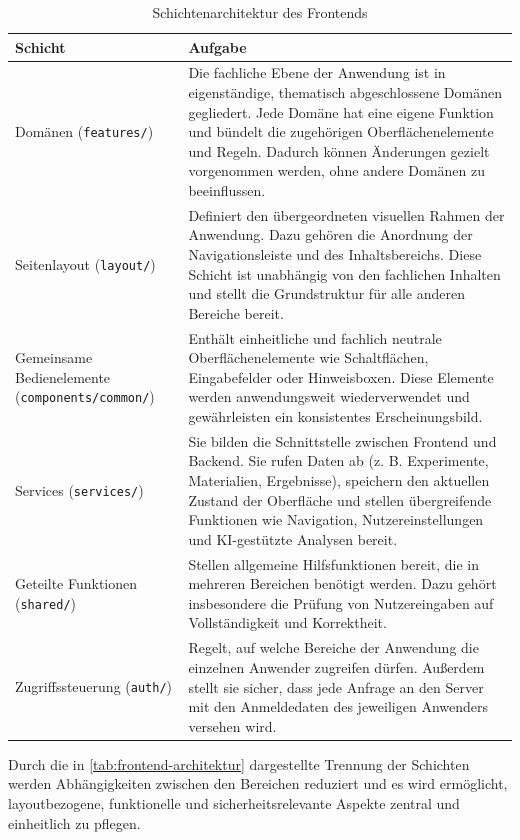 \begin{table}[H]
\centering
\caption{Schichtenarchitektur des Frontends}
\label{tab:frontend-architektur}
\renewcommand{\arraystretch}{1.3}
\begin{tabularx}{\textwidth}{@{}p{}X@{}}
\toprule
\textbf{Schicht} & \textbf{Aufgabe} \\
\midrule
Domänen (\texttt{features/}) & Die fachliche Ebene der Anwendung ist in eigenständige, thematisch abgeschlossene Domänen gegliedert. Jede Domäne hat eine eigene Funktion und bündelt die zugehörigen Oberflächenelemente und Regeln. Dadurch können Änderungen gezielt vorgenommen werden, ohne andere Domänen zu beeinflussen. \\
\addlinespace
Seitenlayout (\texttt{layout/}) & Definiert den übergeordneten visuellen Rahmen der Anwendung. Dazu gehören die Anordnung der Navigationsleiste und des Inhaltsbereichs. Diese Schicht ist unabhängig von den fachlichen Inhalten und stellt die Grundstruktur für alle anderen Bereiche bereit. \\
\addlinespace
Gemeinsame Bedienelemente (\texttt{components/common/}) & Enthält einheitliche und fachlich neutrale Oberflächenelemente wie Schaltflächen, Eingabefelder oder Hinweisboxen. Diese Elemente werden anwendungsweit wiederverwendet und gewährleisten ein konsistentes Erscheinungsbild. \\
\addlinespace
Services (\texttt{services/}) & Sie bilden die Schnittstelle zwischen Frontend und Backend. Sie rufen Daten ab (z. B. Experimente, Materialien, Ergebnisse), speichern den aktuellen Zustand der Oberfläche und stellen übergreifende Funktionen wie Navigation, Nutzereinstellungen und KI-gestützte Analysen bereit. \\
\addlinespace
Geteilte Funktionen (\texttt{shared/}) & Stellen allgemeine Hilfsfunktionen bereit, die in mehreren Bereichen benötigt werden. Dazu gehört insbesondere die Prüfung von Nutzereingaben auf Vollständigkeit und Korrektheit. \\
\addlinespace
Zugriffssteuerung (\texttt{auth/}) & Regelt, auf welche Bereiche der Anwendung die einzelnen Anwender zugreifen dürfen. Außerdem stellt sie sicher, dass jede Anfrage an den Server mit den Anmeldedaten des jeweiligen Anwenders versehen wird. \\
\bottomrule
\end{tabularx}
\end{table}

Durch die in \autoref{tab:frontend-architektur} dargestellte Trennung der Schichten werden Abhängigkeiten zwischen den Bereichen reduziert und es wird ermöglicht, layoutbezogene, funktionelle und sicherheitsrelevante Aspekte zentral und einheitlich zu pflegen.

